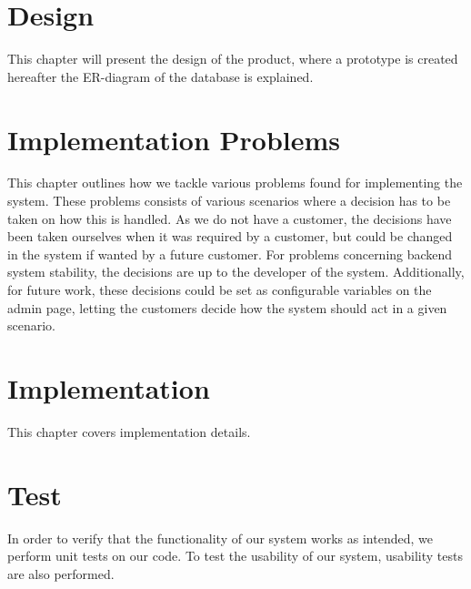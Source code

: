 	\chapter{Design}
	This chapter will present the design of the product, where a prototype is created hereafter the ER-diagram of the database is explained.
	
	
	
	
	
	
	\chapter{Implementation Problems}\label{chap:implementationproblems}
	This chapter outlines how we tackle various problems found for implementing the system.
	These problems consists of various scenarios where a decision has to be taken on how this is handled.
	As we do not have a customer, the decisions have been taken ourselves when it was required by a customer, but could be changed in the system if wanted by a future customer. For problems concerning backend system stability, the decisions are up to the developer of the system.
	Additionally, for future work, these decisions could be set as configurable variables on the admin page, letting the customers decide how the system should act in a given scenario.
	
	
	\chapter{Implementation}
	This chapter covers implementation details.
	
	
	
	
	
	
	
	
	
	
	
	\chapter{Test}
	In order to verify that the functionality of our system works as intended, we perform unit tests on our code. 
    To test the usability of our system, usability tests are also performed.
	
	
	
